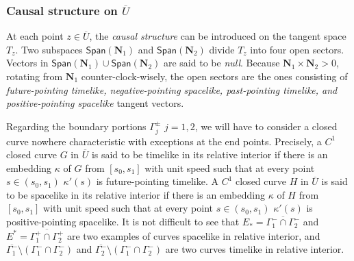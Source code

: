 \documentclass[11pt]{amsart}
\theoremstyle{plain}
\theoremstyle{remark}
\numberwithin{equation}{section}
\numberwithin{Thm}{section}
\def\U{\overline{U}}
\def\N{{\mathbf N}}
\begin{document}
\subsubsection{Causal structure on $\U$}

 At each point $z\in \U$, the {\it causal structure} can be introduced on the tangent space $T_z$. Two subspaces $\textsf{Span}(\N_1)$ and $\textsf{Span}(\N_2)$ divide $T_z$ into four open sectors. Vectors in $\textsf{Span}(\N_1) \cup \textsf{Span}(\N_2)$ are said to be {\it null}. Because $\N_1 \times \N_2 >0$, rotating from $\N_1$ counter-clock-wisely, the open sectors are the ones consisting of {\it future-pointing timelike, negative-pointing spacelike, past-pointing timelike, and positive-pointing spacelike} tangent vectors. 
 
 Regarding the boundary portions $\Gamma^\pm_j$ $j=1,2$, we will have to consider a closed curve nowhere characteristic with exceptions at the end points. Precisely, a $C^1$ closed curve $G$ in $\U$ is said to be timelike in its relative interior if there is an embedding $\kappa$ of $G$ from $[s_0,s_1]$ with unit speed such that at every point $s\in(s_0,s_1)$ $\kappa'(s)$ is future-pointing timelike. A $C^1$ closed curve $H$ in $\U$ is said to be spacelike in its relative interior if there is an embedding $\kappa$ of $H$ from $[s_0,s_1]$ with unit speed such that at every point $s\in(s_0,s_1)$ $\kappa'(s)$ is positive-pointing spacelike. It is not difficult to see that $E_*=\overline{\Gamma_1^-\cap \Gamma_2^-}$ and $E^*=\overline{\Gamma_1^+\cap \Gamma_2^+}$ are two examples of curves spacelike in relative interior, and $\overline{\Gamma_1^-} \setminus (\Gamma_1^-\cap \Gamma_2^-)$ and $\overline{\Gamma_2^-} \setminus (\Gamma_1^-\cap \Gamma_2^-)$ are two curves timelike in relative interior.
 
\end{document}
